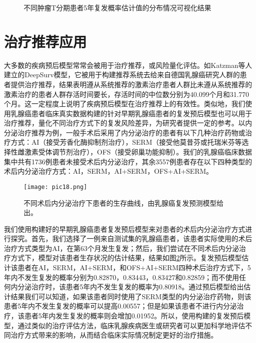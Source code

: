 \begin{figure}[h]
\centering 
{}
\hspace{0.01\linewidth}
\caption{不同肿瘤T分期患者5年复发概率估计值的分布情况可视化结果}
\label{pic17}
\end{figure}

\section{治疗推荐应用}
大多数的疾病预后模型常常会被用于治疗推荐，或风险量化评估。如Katzman等人 建立的DeepSurv模型，它被用于构建推荐系统去给来自德国乳腺癌研究人群的患者提供治疗推荐，结果表明遵从系统推荐的激素治疗患者人群比未遵从系统推荐的激素治疗的患者人群存活时间要长，存活时间的中位数分别为40.099个月和31.770个月。这一定程度上说明了疾病预后模型在治疗推荐上的有效性。类似地，我们使用乳腺癌患者临床真实数据构建的针对早期乳腺癌患者的复发预后模型也可以用于治疗推荐，量化不同治疗方式下的复发风险差异，为研究者提供一定的参考。以内分泌治疗推荐为例，一般手术后采用了内分泌治疗的患者有以下几种治疗药物或治疗方式：AI（接受芳香化酶抑制剂治疗），SERM（接受他莫昔芬或托瑞米芬等选择性雌激素受体调节剂治疗），OFS（接受卵巢功能抑制）。我们的乳腺癌临床数据集中共有1736例患者未接受术后内分泌治疗，其余3557例患者存在以下四种类型的术后内分泌治疗方式：AI，SERM，AI+SERM，OFS+AI+SERM。

\begin{figure}[H]
\texttt{[image: pic18.png]}
\caption{不同术后内分泌治疗下患者的生存曲线，由乳腺癌复发预测模型给出。}
\label{pic18}
\end{figure}

我们使用构建好的早期乳腺癌患者复发预后模型来对患者的术后内分泌治疗方式进行探究。首先，我们选择了一例来自测试集的乳腺癌患者，该患者实际使用的术后治疗方式类型为AI，在第63个月发生复发；然后，我们尝试在不同术后内分泌治疗方式下，模型对该患者生存状况的估计结果，结果如图\ref{pic18}所示。复发预后模型估计该患者在AI，SERM，AI+SERM，和OFS+AI+SERM四种术后治疗方式下，5年内不发生复发的概率分别为0.82870，0.83443，0.83427和0.82859；而不使用任何内分泌治疗时，该患者5年内不发生复发的概率为0.80918。通过预后模型给出估计结果我们可以知道，如果该患者同时使用了SERM类型的内分泌治疗药物，则该患者5年内不发生复发的概率可以提高0.00557；但是如果该患者不进行内分泌治疗，该患者5年内发生复发的概率则会增加0.01952。所以，使用构建的复发预后模型，通过类似的治疗评估方法，临床乳腺疾病医生或研究者可以更加科学地评估不同治疗方式带来的影响，从而结合临床实际情况制定更好的治疗措施。

